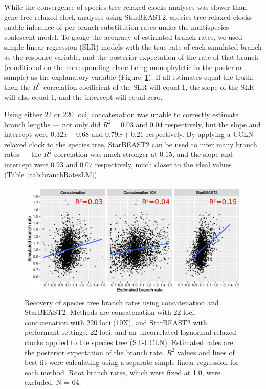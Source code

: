 \documentclass[12pt]{article}
\begin{document}
While the convergence of species tree relaxed clocks analyses was slower than gene tree
relaxed clock analyses using StarBEAST2, species tree relaxed clocks enable inference of per-branch
substitution rates under the multispecies coalescent model. To gauge the
accuracy of estimated branch rates, we used simple linear regression (SLR)
models with the true rate of each simulated branch as the response variable, and
the posterior expectation of the rate of that branch (conditional on the
corresponding clade being monophyletic in the posterior sample) as the
explanatory variable (Figure~\ref{fig:branchRatesLM}). If all estimates equal
the truth, then the $R^2$ correlation coefficient of the SLR will equal 1, the
slope of the SLR will also equal 1, and the intercept will equal zero.

Using either 22 or 220 loci, concatenation was unable to correctly estimate
branch lengths --- not only did $R^2 = 0.03$ and $0.04$ respectively, but the
slope and intercept were $0.32x + 0.68$ and $0.79x + 0.21$ respectively. By
applying a UCLN relaxed clock to the species tree, StarBEAST2 can be used to
infer many branch rates --- the $R^2$ correlation was much stronger at $0.15$,
and the slope and intercept were $0.93$ and $0.07$ respectively, much closer to
the ideal values (Table~\ref{tab:branchRatesLM}).

\begin{figure}[htb!]
\centering
\includegraphics[width=16cm]{branch_rates.pdf}
\caption
{Recovery of species tree branch rates using concatenation and StarBEAST2.
Methods are concatenation with 22 loci, concatenation with 220 loci (10X), and
StarBEAST2 with performant settings, 22 loci, and an uncorrelated lognormal
relaxed clocks applied to the species tree (ST-UCLN). Estimated rates are the
posterior expectation of the branch rate. $R^2$ values and lines of best fit were calculating using a separate
simple linear regression for each method. Root branch rates, which were fixed at
1.0, were excluded. N = 64.}
\label{fig:branchRatesLM}
\end{figure}
\end{document}
